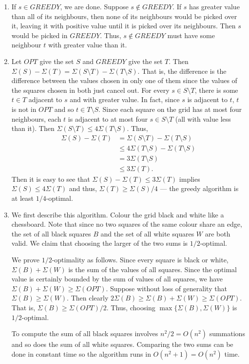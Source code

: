 \documentclass[12 pt, letterpaper]{hmcpset}
\begin{document}
\begin{solution}
	\begin{enumerate}
		\item If $s \in GREEDY$, we are done. Suppose $s \notin GREEDY$. If $s$ has greater value than all of its neighbours, then none of its neighbours would be picked over it, leaving it with positive value until it is picked over its neighbours. Then $s$ would be picked in $GREEDY$. Thus, $s \notin GREEDY$ must have some neighbour $t$ with greater value than it.

		\item Let $OPT$ give the set $S$ and $GREEDY$ give the set $T$. Then $\Sigma(S) - \Sigma(T) = \Sigma(S \setminus T) - \Sigma(T \setminus S)$. That is, the difference is the difference between the values chosen in only one of them since the values of the squares chosen in both just cancel out. For every $s \in S \setminus T$, there is some $t \in T$ adjacent to $s$ and with greater value. In fact, since $s$ is adjacent to $t$, $t$ is not in $OPT$ and so  $t \in T \setminus S$. Since each square on the grid has at most four neighbours, each $t$ is adjacent to at most four $s \in S \setminus T$ (all with value less than it). Then $\Sigma(S \setminus T) \le 4 \Sigma(T \setminus S)$. Thus,
			\begin{align*}
				\Sigma(S) - \Sigma(T) & = \Sigma(S \setminus T) - \Sigma(T \setminus S) \\
						      & \le 4\Sigma(T \setminus S) - \Sigma(T \setminus S) \\
						      & =  3 \Sigma(T \setminus S) \\
						      & \le 3 \Sigma(T).
			\end{align*}
			Then it is easy to see that $\Sigma(S) - \Sigma(T) \le 3 \Sigma(T)$ implies $\Sigma(S) \le 4 \Sigma(T)$ and thus, $\Sigma(T) \ge \Sigma(S) / 4$ --- the greedy algorithm is at least $1 / 4$-optimal.

		\item We first describe this algorithm. Colour the grid black and white like a chessboard. Note that since no two squares of the same colour share an edge, the set of all black squares $B$ and the set of all white squares $W$ are both valid. We claim that choosing the larger of the two sums is $1 / 2$-optimal.

			We prove $1/2$-optimality as follows. Since every square is black or white, $\Sigma(B) + \Sigma(W)$ is the sum of the values of all squares. Since the optimal value is certainly bounded by the sum of values of all squares, we have $\Sigma(B) + \Sigma(W) \ge \Sigma(OPT)$. Suppose without loss of generality that $\Sigma(B) \ge \Sigma(W)$. Then clearly $2 \Sigma(B) \ge \Sigma(B) + \Sigma(W) \ge \Sigma(OPT)$. That is, $\Sigma(B) \ge \Sigma(OPT) / 2$. Thus, choosing $\max \{ \Sigma(B), \Sigma(W) \}$ is $1 / 2$-optimal.

			To compute the sum of all black squares involves $n^{2} / 2 = O(n^{2})$ summations and so does the sum of all white squares. Comparing the two sums can be done in constant time so the algorithm runs in $O(n^{2} + 1) = O(n^{2})$ time.
	\end{enumerate}
\end{solution}
\end{document}
